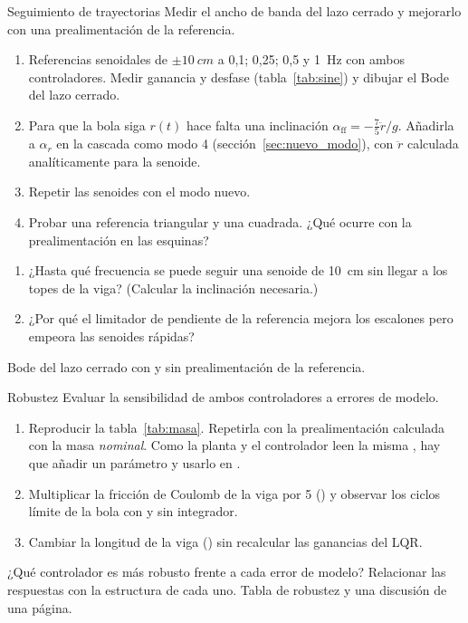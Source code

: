 \label{pr:segui}
\begin{practica}{Seguimiento de trayectorias}
\objetivos Medir el ancho de banda del lazo cerrado y mejorarlo con una prealimentación de la referencia.
\procedimiento
\begin{enumerate}
  \item Referencias senoidales de $\pm\SI{10}{cm}$ a 0,1; 0,25; 0,5 y \SI{1}{Hz} con ambos controladores. Medir ganancia y desfase (tabla~\ref{tab:sine}) y dibujar el Bode del lazo cerrado.
  \item Para que la bola siga $r(t)$ hace falta una inclinación $\alpha_{\text{ff}}=-\tfrac75\ddot r/g$. Añadirla a $\alpha_r$ en la cascada como modo 4 (sección~\ref{sec:nuevo_modo}), con $\ddot r$ calculada analíticamente para la senoide.
  \item Repetir las senoides con el modo nuevo.
  \item Probar una referencia triangular y una cuadrada. ¿Qué ocurre con la prealimentación en las esquinas?
\end{enumerate}
\preguntas
\begin{enumerate}
  \item ¿Hasta qué frecuencia se puede seguir una senoide de \SI{10}{cm} sin llegar a los topes de la viga? (Calcular la inclinación necesaria.)
  \item ¿Por qué el limitador de pendiente de la referencia mejora los escalones pero empeora las senoides rápidas?
\end{enumerate}
\entregables Bode del lazo cerrado con y sin prealimentación de la referencia.
\end{practica}

\label{pr:robustez}
\begin{practica}{Robustez}
\objetivos Evaluar la sensibilidad de ambos controladores a errores de modelo.
\procedimiento
\begin{enumerate}
  \item Reproducir la tabla~\ref{tab:masa}. Repetirla con la prealimentación calculada con la masa \emph{nominal}. Como la planta y el controlador leen la misma , hay que añadir un parámetro  y usarlo en .
  \item Multiplicar la fricción de Coulomb de la viga por 5 () y observar los ciclos límite de la bola con y sin integrador.
  \item Cambiar la longitud de la viga () sin recalcular las ganancias del LQR.
\end{enumerate}
\preguntas ¿Qué controlador es más robusto frente a cada error de modelo? Relacionar las respuestas con la estructura de cada uno.
\entregables Tabla de robustez y una discusión de una página.
\end{practica}

